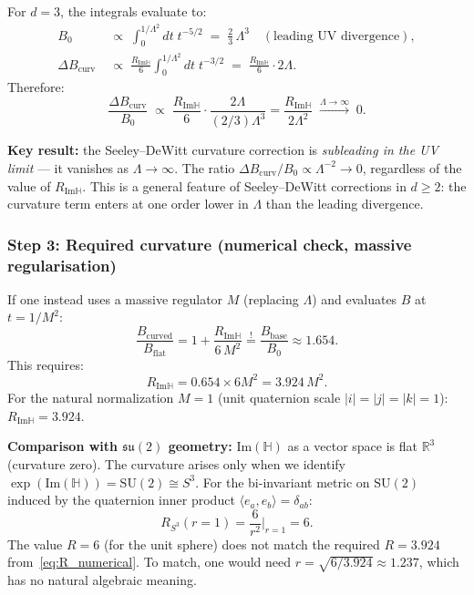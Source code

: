\documentclass[11pt,a4paper]{article}
\theoremstyle{definition}
\theoremstyle{remark}
\begin{document}
For $d = 3$, the integrals evaluate to:
\begin{align}
  B_0 &\;\propto\; \int_0^{1/\Lambda^2} dt\;t^{-5/2}
       \;=\; \tfrac{2}{3}\,\Lambda^3
       \quad (\text{leading UV divergence}),
       \label{eq:B0_UV} \\[4pt]
  \Delta B_{\mathrm{curv}} &\;\propto\;
       \frac{R_{\mathrm{Im}\mathbb{H}}}{6}
       \int_0^{1/\Lambda^2} dt\;t^{-3/2}
    \;=\; \frac{R_{\mathrm{Im}\mathbb{H}}}{6}\cdot 2\Lambda.
       \label{eq:DeltaB_UV}
\end{align}
Therefore:
\begin{equation}
  \frac{\Delta B_{\mathrm{curv}}}{B_0}
    \;\propto\; \frac{R_{\mathrm{Im}\mathbb{H}}}{6}\cdot \frac{2\Lambda}{(2/3)\Lambda^3}
    = \frac{R_{\mathrm{Im}\mathbb{H}}}{2\Lambda^2}
    \;\xrightarrow{\Lambda \to \infty}\; 0.
  \label{eq:ratio_curv}
\end{equation}

\textbf{Key result:} the Seeley--DeWitt curvature correction is \emph{subleading
in the UV limit} — it vanishes as $\Lambda \to \infty$.
The ratio $\Delta B_{\mathrm{curv}} / B_0 \propto \Lambda^{-2} \to 0$,
regardless of the value of $R_{\mathrm{Im}\mathbb{H}}$.
This is a general feature of Seeley--DeWitt corrections in $d \ge 2$:
the curvature term enters at one order lower in $\Lambda$ than the leading divergence.

\subsubsection{Step 3: Required curvature (numerical check, massive regularisation)}

If one instead uses a massive regulator $M$ (replacing $\Lambda$) and evaluates
$B$ at $t = 1/M^2$:
\begin{equation}
  \frac{B_{\mathrm{curved}}}{B_{\mathrm{flat}}}
    = 1 + \frac{R_{\mathrm{Im}\mathbb{H}}}{6\,M^2}
    \stackrel{!}{=} \frac{B_{\mathrm{base}}}{B_0} \approx 1.654.
  \label{eq:R_required}
\end{equation}
This requires:
\begin{equation}
  R_{\mathrm{Im}\mathbb{H}} = 0.654 \times 6 M^2 = 3.924\,M^2.
  \label{eq:R_numerical}
\end{equation}
For the natural normalization $M = 1$ (unit quaternion scale $|i| = |j| = |k| = 1$):
$R_{\mathrm{Im}\mathbb{H}} = 3.924$.

\noindent\textbf{Comparison with $\mathfrak{su}(2)$ geometry:}
$\mathrm{Im}(\mathbb{H})$ as a vector space is flat $\mathbb{R}^3$ (curvature zero).
The curvature arises only when we identify $\exp(\mathrm{Im}(\mathbb{H})) = \mathrm{SU}(2) \cong S^3$.
For the bi-invariant metric on $\mathrm{SU}(2)$ induced by the quaternion inner product
$\langle e_a, e_b \rangle = \delta_{ab}$:
\begin{equation}
  R_{S^3}(r=1) = \frac{6}{r^2}\Big|_{r=1} = 6.
  \label{eq:R_S3}
\end{equation}
The value $R = 6$ (for the unit sphere) does not match the required $R = 3.924$
from~\eqref{eq:R_numerical}.
To match, one would need $r = \sqrt{6/3.924} \approx 1.237$,
which has no natural algebraic meaning.
\end{document}
